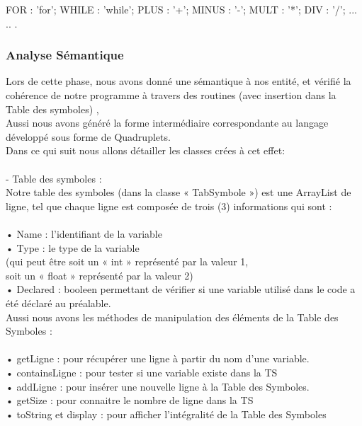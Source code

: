 \documentclass[12pt]{article}
\begin{document}
\begin{sql}
FOR : 'for';
WHILE : 'while';
PLUS : '+';
MINUS : '-';
MULT : '*';
DIV : '/';
...
..
.
\end{sql}


\subsubsection{Analyse Sémantique}
Lors de cette phase, nous avons donné une sémantique à nos entité, et vérifié la cohérence de notre programme à travers des routines (avec insertion dans la Table des symboles) , \\
Aussi nous avons généré la forme intermédiaire correspondante au langage développé sous forme de Quadruplets.\\

Dans ce qui suit nous allons détailler les classes crées à cet effet:\\
\texttt{ }\\ 
 
\color{blue}
-	Table des symboles : \\
\color{black}
Notre table des symboles (dans la classe « TabSymbole ») est une ArrayList de ligne, tel que chaque ligne est composée de trois (3) informations qui sont :\\
\texttt{ }\\
•	Name : l'identifiant de la variable \\
•	Type : le type de la variable\\
(qui peut être soit un « int » représenté par la valeur 1,\\
 soit un « float » représenté par la valeur 2)\\
•	Declared : booleen permettant de vérifier si une variable utilisé dans le code a été déclaré au préalable.\\

Aussi nous avons les méthodes de manipulation des éléments de la Table des Symboles :\\
\texttt{ }\\
•	getLigne : pour récupérer une ligne à partir du nom d'une variable.\\
•	containsLigne : pour tester si une variable existe dans la TS\\
•	addLigne : pour insérer une nouvelle ligne à la Table des Symboles.\\
•	getSize : pour connaitre le nombre de ligne dans la TS\\
•	toString et display : pour afficher l'intégralité de la Table des Symboles\\
\end{document}
